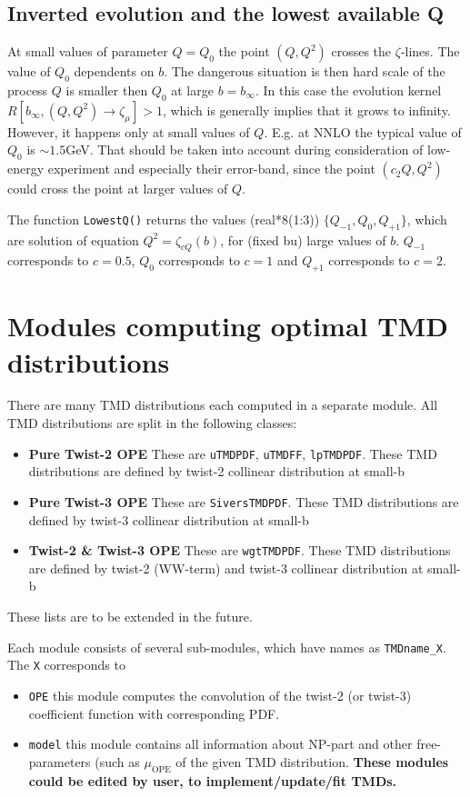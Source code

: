 \documentclass[prd,nofootinbib,eqsecnum,final]{revtex4}
\renewcommand{\(}{\left(}
\renewcommand{\)}{\right)}
\renewcommand{\[}{\left[}
\renewcommand{\]}{\right]}
\newcommand{\blue}[1]{{\color{blue} #1}}
\begin{document}
\subsection{Inverted evolution and the lowest available Q}
\label{TMDR:Q}

At small values of parameter $Q=Q_0$ the point $(Q,Q^2)$ crosses the $\zeta$-lines. The value of $Q_0$ dependents on $b$. The dangerous situation is then hard scale of the process $Q$ is smaller then $Q_0$ at large $b=b_\infty$. In this case the evolution kernel $R[b_\infty,(Q,Q^2)\to \zeta_\mu]>1$, which is generally implies that it grows to infinity. However, it happens only at small values of $Q$. E.g. at NNLO the typical value of $Q_0$ is $\sim 1.5$GeV. That should be taken into account during consideration of low-energy experiment and especially their error-band, since the point $(c_2Q,Q^2)$ could cross the point at larger values of $Q$.

The function \texttt{LowestQ()} returns the values (real*8(1:3)) $\{Q_{-1},Q_0,Q_{+1}\}$, which are solution of equation $Q^2=\zeta_{c Q}(b)$, for (fixed bu) large values of $b$. $Q_{-1}$ corresponds to $c=0.5$, $Q_0$ corresponds to $c=1$ and $Q_{+1}$ corresponds to $c=2$.

\newpage

\section{Modules computing optimal TMD distributions}

There are many TMD distributions each computed in a separate module. All TMD distributions are split in the following classes:
\begin{itemize}
\item \textbf{Pure Twist-2 OPE} These are \texttt{uTMDPDF}, \texttt{uTMDFF}, \texttt{lpTMDPDF}. These TMD distributions are defined by twist-2 collinear distribution at small-b
\item \textbf{Pure Twist-3 OPE} These are \texttt{SiversTMDPDF}. These TMD distributions are defined by twist-3 collinear distribution at small-b
\item \textbf{Twist-2 \& Twist-3 OPE} These are \texttt{wgtTMDPDF}. These TMD distributions are defined by twist-2 (WW-term) and twist-3 collinear distribution at small-b
\end{itemize}
These lists are to be extended in the future. 

Each module consists of several sub-modules, which have names as \texttt{TMDname\_X}. The \texttt{X} corresponds to
\begin{itemize}
\item  \texttt{OPE} this module computes the convolution of the twist-2 (or twist-3) coefficient function with corresponding PDF.
\item \texttt{model} this module contains all information about NP-part and other free-parameters (such as $\mu_{\text{OPE}}$ of the given TMD distribution. \textbf{\blue{These modules could be edited by user, to implement/update/fit TMDs.}}
\end{itemize}
\end{document}
